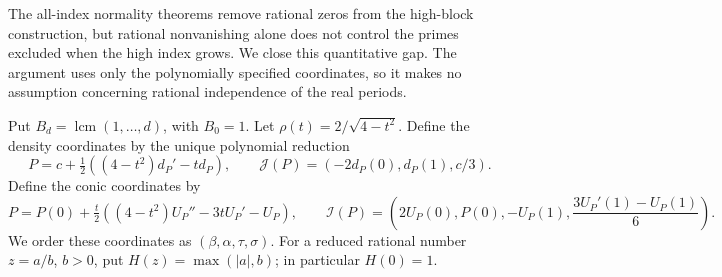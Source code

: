 \documentclass[11pt,a4paper]{article}
\numberwithin{equation}{section}
\theoremstyle{definition}\newtheorem{definition}[theorem]{Definition}
\theoremstyle{remark}\newtheorem{remark}[theorem]{Remark}
\begin{document}
The all-index normality theorems remove rational zeros from the high-block
construction, but rational nonvanishing alone does not control the primes
excluded when the high index grows. We close this quantitative gap. The
argument uses only the polynomially specified coordinates, so it makes no
assumption concerning rational independence of the real periods.

Put $B_d=\operatorname{lcm}(1,\ldots,d)$, with $B_0=1$. Let
$\rho(t)=2/\sqrt{4-t^2}$. Define the density coordinates by the unique
polynomial reduction
\[
 P=c+\tfrac12((4-t^2)d_P'-t d_P),\qquad
 \mathcal J(P)=(-2d_P(0),d_P(1),c/3).
\]
Define the conic coordinates by
\[
 P=P(0)+\tfrac t2((4-t^2)U_P''-3tU_P'-U_P),\qquad
 \mathcal I(P)=\left(2U_P(0),P(0),-U_P(1),
                         \frac{3U_P'(1)-U_P(1)}6\right).
\]
We order these coordinates as $(\beta,\alpha,\tau,\sigma)$.
For a reduced rational number $z=a/b$, $b>0$, put
$H(z)=\max(|a|,b)$; in particular $H(0)=1$.
\end{document}
